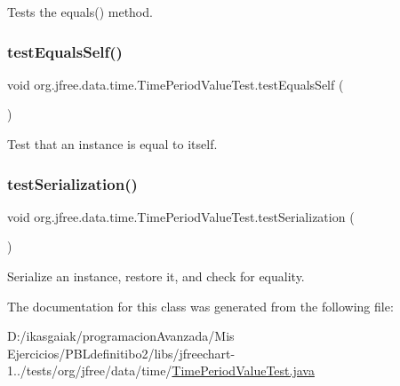 Tests the equals() method. \mbox{\label{classorg_1_1jfree_1_1data_1_1time_1_1_time_period_value_test_a6adee1ec48d2f2cfa4b61f7467625f76}} 
\subsubsection{\texorpdfstring{test\+Equals\+Self()}{testEqualsSelf()}}
{\footnotesize\ttfamily void org.\+jfree.\+data.\+time.\+Time\+Period\+Value\+Test.\+test\+Equals\+Self (\begin{DoxyParamCaption}{ }\end{DoxyParamCaption})}

Test that an instance is equal to itself. \mbox{\label{classorg_1_1jfree_1_1data_1_1time_1_1_time_period_value_test_ad500e44d91a366eeaabfcffaf6c50241}} 
\subsubsection{\texorpdfstring{test\+Serialization()}{testSerialization()}}
{\footnotesize\ttfamily void org.\+jfree.\+data.\+time.\+Time\+Period\+Value\+Test.\+test\+Serialization (\begin{DoxyParamCaption}{ }\end{DoxyParamCaption})}

Serialize an instance, restore it, and check for equality. 

The documentation for this class was generated from the following file\+:\begin{DoxyCompactItemize}
\item 
D\+:/ikasgaiak/programacion\+Avanzada/\+Mis Ejercicios/\+P\+B\+Ldefinitibo2/libs/jfreechart-\/1../tests/org/jfree/data/time/\mbox{\hyperlink{_time_period_value_test_8java}{Time\+Period\+Value\+Test.\+java}}\end{DoxyCompactItemize}
